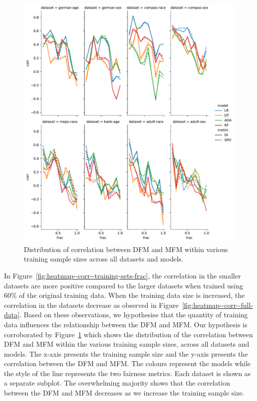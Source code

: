 \documentclass{article}
\begin{document}
\begin{figure}
  \centering
  \includegraphics[width=0.95\linewidth]{lineplot--frac--corr.pdf}
  \caption{Distribution of correlation between DFM and MFM within
  various training sample sizes across all datasets and models.}
  \label{fig:lineplot--frac--corr}
\end{figure}

In Figure \ref{fig:heatmap--corr--training-sets-frac}, the correlation
in the smaller datasets are more positive compared to the larger
datasets when trained using 60\% of the original training data. When
the training data size is increased, the correlation in the datasets
decrease as observed in
Figure \ref{fig:heatmap--corr--full-data}. Based on these
observations, we hypothesise that the quantity of training data
influences the relationship between the DFM and MFM. Our hypothesis is
corroborated by Figure \ref{fig:lineplot--frac--corr} which shows the
distribution of the correlation between DFM and MFM within the various
training sample sizes, across all datasets and models. The x-axis
presents the training sample size and the y-axis presents the
correlation between the DFM and MFM. The colours represent the models
while the style of the line represents the two fairness metrics. Each
dataset is shown as a separate subplot. The overwhelming majority
shows that the correlation between the DFM and MFM decreases as we
increase the training sample size.
\end{document}
